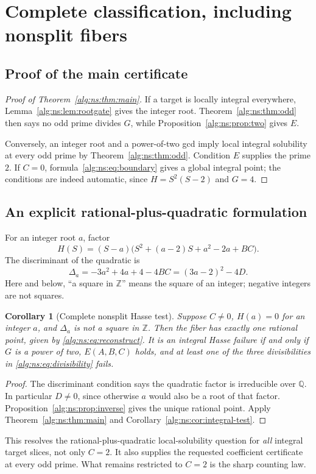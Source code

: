 \documentclass[11pt]{article}
\numberwithin{equation}{section}
\theoremstyle{plain}
\theoremstyle{plain}
\theoremstyle{plain}
\newtheorem{corollary}[corollary]{Corollary}
\theoremstyle{definition}
\theoremstyle{definition}
\theoremstyle{definition}
\theoremstyle{remark}
\newcommand{\Z}{\mathbb Z}\newcommand{\Q}{\mathbb Q}
\begin{document}
\section{Complete classification, including nonsplit fibers}\label{alg:ns:sec:complete}

\subsection{Proof of the main certificate}
\begin{proof}[Proof of Theorem~\ref{alg:ns:thm:main}]
If a target is locally integral everywhere, Lemma~\ref{alg:ns:lem:rootgate}
gives the integer root. Theorem~\ref{alg:ns:thm:odd} then says no odd prime
divides $G$, while Proposition~\ref{alg:ns:prop:two} gives $E$.

Conversely, an integer root and a power-of-two gcd imply local integral
solubility at every odd prime by Theorem~\ref{alg:ns:thm:odd}. Condition $E$
supplies the prime $2$. If $C=0$, formula~\eqref{alg:ns:eq:boundary} gives a
global integral point; the conditions are indeed automatic, since
$H=S^2(S-2)$ and $G=4$.
\end{proof}

\subsection{An explicit rational-plus-quadratic formulation}
For an integer root $a$, factor
\begin{equation}\label{alg:ns:eq:factor-H}
H(S)=(S-a)\bigl(S^2+(a-2)S+a^2-2a+BC\bigr).
\end{equation}
The discriminant of the quadratic is
\begin{equation}\label{alg:ns:eq:delta-H}
\Delta_a=-3a^2+4a+4-4BC=(3a-2)^2-4D.
\end{equation}
Here and below, ``a square in $\Z$'' means the square of an integer;
negative integers are not squares.

\begin{corollary}[Complete nonsplit Hasse test]\label{alg:ns:cor:nonsplit}
Suppose $C\ne0$, $H(a)=0$ for an integer $a$, and $\Delta_a$ is not a
square in $\Z$. Then the fiber has exactly one rational point, given by
\eqref{alg:ns:eq:reconstruct}. It is an integral Hasse failure if and only if
$G$ is a power of two, $E(A,B,C)$ holds, and at least one of the three
divisibilities in \eqref{alg:ns:eq:divisibility} fails.
\end{corollary}
\begin{proof}
The discriminant condition says the quadratic factor is irreducible
over $\Q$. In particular $D\ne0$, since otherwise $a$ would also be a
root of that factor. Proposition~\ref{alg:ns:prop:inverse} gives the unique
rational point. Apply Theorem~\ref{alg:ns:thm:main} and
Corollary~\ref{alg:ns:cor:integral-test}.
\end{proof}
This resolves the rational-plus-quadratic local-solubility question for
\emph{all} integral target slices, not only $C=2$. It also supplies the
requested coefficient certificate at every odd prime. What remains
restricted to $C=2$ is the sharp counting law.
\end{document}

